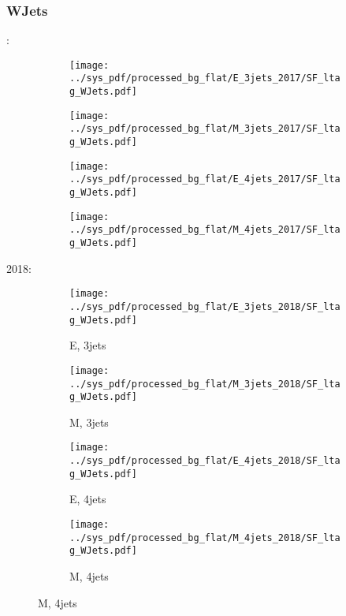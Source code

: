 \documentclass{beamer}
\begin{document}
\begin{frame}
\frametitle{WJets}
\fontsize{5}{1}:
\begin{figure}
\centering
\begin{subfigure}[b]{0.24\textwidth}
\texttt{[image: ../sys\_pdf/processed\_bg\_flat/E\_3jets\_2017/SF\_ltag\_WJets.pdf]}
\end{subfigure}
\begin{subfigure}[b]{0.24\textwidth}
\texttt{[image: ../sys\_pdf/processed\_bg\_flat/M\_3jets\_2017/SF\_ltag\_WJets.pdf]}
\end{subfigure}
\begin{subfigure}[b]{0.24\textwidth}
\texttt{[image: ../sys\_pdf/processed\_bg\_flat/E\_4jets\_2017/SF\_ltag\_WJets.pdf]}
\end{subfigure}
\begin{subfigure}[b]{0.24\textwidth}
\texttt{[image: ../sys\_pdf/processed\_bg\_flat/M\_4jets\_2017/SF\_ltag\_WJets.pdf]}
\end{subfigure}
\end{figure}
2018:
\begin{figure}
\centering
\begin{subfigure}[b]{0.24\textwidth}
\texttt{[image: ../sys\_pdf/processed\_bg\_flat/E\_3jets\_2018/SF\_ltag\_WJets.pdf]}
\captionsetup{font=tiny}
\caption{E, 3jets}
\end{subfigure}
\begin{subfigure}[b]{0.24\textwidth}
\texttt{[image: ../sys\_pdf/processed\_bg\_flat/M\_3jets\_2018/SF\_ltag\_WJets.pdf]}
\captionsetup{font=tiny}
\caption{M, 3jets}
\end{subfigure}
\begin{subfigure}[b]{0.24\textwidth}
\texttt{[image: ../sys\_pdf/processed\_bg\_flat/E\_4jets\_2018/SF\_ltag\_WJets.pdf]}
\captionsetup{font=tiny}
\caption{E, 4jets}
\end{subfigure}
\begin{subfigure}[b]{0.24\textwidth}
\texttt{[image: ../sys\_pdf/processed\_bg\_flat/M\_4jets\_2018/SF\_ltag\_WJets.pdf]}
\captionsetup{font=tiny}
\caption{M, 4jets}
\end{subfigure}
\end{figure}
\end{frame}
\end{document}
